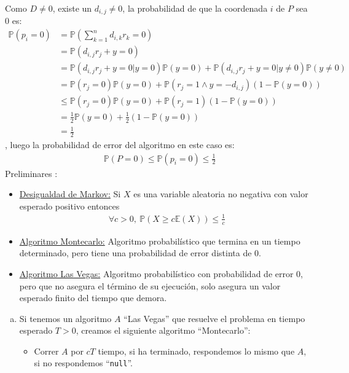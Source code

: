 \documentclass[dcc,uchile]{fcfmcourse}
\begin{document}
\begin{problems}
Como $D\not = 0$, existe un $d_{i,j}\not = 0$, la probabilidad de que la coordenada $i$ de $P$ sea 0 es:
\begin{align*}
    \mathbb{P}\left(p_{i} = 0\right) &= \mathbb{P}\left(\sum_{k=1}^n d_{i,k}r_k = 0\right)\\
    &=\mathbb{P}\left(d_{i,j}r_j + y = 0\right)\\
    &= \mathbb{P}\left(d_{i,j}r_j + y = 0 | y = 0\right)\mathbb{P}(y = 0) + \mathbb{P}\left(d_{i,j}r_j + y = 0 | y \not= 0\right)\mathbb{P}(y \not= 0)\\
    &=  \mathbb{P}\left(r_j = 0\right)\mathbb{P}(y = 0) + \mathbb{P}\left(r_j = 1 \land  y = -d_{i,j} \right)(1-\mathbb{P}(y = 0))\\
    &\le \mathbb{P}\left(r_j = 0\right)\mathbb{P}(y = 0) + \mathbb{P}\left(r_j = 1\right)(1-\mathbb{P}(y = 0))\\
    &= \frac{1}{2}\mathbb{P}(y = 0) + \frac{1}{2}(1-\mathbb{P}(y = 0))\\
    &= \frac{1}{2}
\end{align*}
, luego la probabilidad de error del algoritmo en este caso es:
\begin{align*}
    \mathbb{P}(P=0) \le \mathbb{P}(p_{i}=0)\le \frac{1}{2}
\end{align*}
\problem 
Preliminares :
\begin{itemize}
    \item \underline{Desigualdad de Markov:} Si $X$ es una variable aleatoria no negativa con valor esperado positivo entonces
    \begin{align*}
        \forall c > 0,\ \mathbb{P}(X \ge c \mathbb{E}(X)) \le \frac{1}{c}
    \end{align*}
    \item \underline{Algoritmo Montecarlo:} Algoritmo probabilístico que termina en un tiempo determinado, pero tiene una probabilidad de error distinta de $0$.
    \item \underline{Algoritmo Las Vegas:} Algoritmo probabilístico con probabilidad de error $0$, pero que no asegura el término de su ejecución, solo asegura un valor esperado finito del tiempo que demora.
\end{itemize}
\begin{enumerate}[a)]
\item Si tenemos un algoritmo $A$ ``Las Vegas'' que resuelve el problema en tiempo esperado $T > 0$, creamos el siguiente algoritmo ``Montecarlo'':
\begin{itemize}
    \item Correr $A$ por $cT$ tiempo, si ha terminado, respondemos lo mismo que $A$, si no respondemos ``\texttt{null}''.

\end{itemize}
\end{enumerate}
\end{problems}
\end{document}
